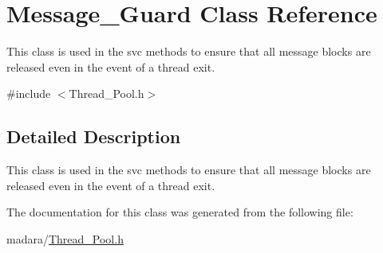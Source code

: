 \hypertarget{classMessage__Guard}{
\section{Message\_\-Guard Class Reference}
\label{d0/df5/classMessage__Guard}
}


This class is used in the svc methods to ensure that all message blocks are released even in the event of a thread exit.  




{\ttfamily \#include $<$Thread\_\-Pool.h$>$}



\subsection{Detailed Description}
This class is used in the svc methods to ensure that all message blocks are released even in the event of a thread exit. 

The documentation for this class was generated from the following file:\begin{DoxyCompactItemize}
\item 
madara/\hyperlink{Thread__Pool_8h}{Thread\_\-Pool.h}\end{DoxyCompactItemize}

